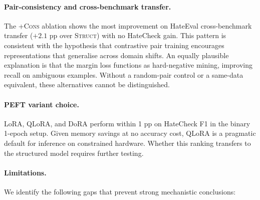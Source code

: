 \documentclass{article}
\begin{document}
\paragraph{Pair-consistency and cross-benchmark transfer.}
The \textsc{+Cons} ablation shows the most improvement on HateEval cross-benchmark
transfer ($+2.1$ pp over \textsc{Struct}) with no HateCheck gain.
This pattern is consistent with the hypothesis that contrastive pair training
encourages representations that generalise across domain shifts.
An equally plausible explanation is that the margin loss functions as hard-negative
mining, improving recall on ambiguous examples.
Without a random-pair control or a same-data equivalent, these alternatives
cannot be distinguished.

\paragraph{PEFT variant choice.}
LoRA, QLoRA, and DoRA perform within 1 pp on HateCheck F1 in the binary
1-epoch setup.
Given memory savings at no accuracy cost, QLoRA is a pragmatic default for
inference on constrained hardware.
Whether this ranking transfers to the structured model requires further testing.

\paragraph{Limitations.}
\label{sec:limits}
We identify the following gaps that prevent strong mechanistic conclusions:
\end{document}
